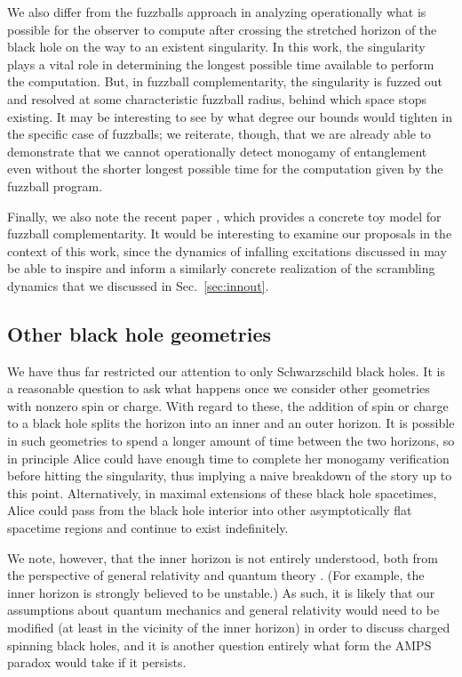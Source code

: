 \documentclass[a4paper,11pt]{article}
\theoremstyle{definition}
\newcommand{\Sec}[1]{Sec.~\ref{#1}}
\begin{document}
We also differ from the fuzzballs approach in analyzing operationally what is possible for the observer to compute after crossing the stretched horizon of the black hole on the way to an existent singularity.
In this work, the singularity plays a vital role in determining the longest possible time available to perform the computation.
But, in fuzzball complementarity, the singularity is fuzzed out and resolved at some characteristic fuzzball radius, behind which space stops existing. 
It may be interesting to see by what degree our bounds would tighten in the specific case of fuzzballs; we reiterate, though, that we are already able to demonstrate that we cannot operationally detect monogamy of entanglement even without the shorter longest possible time for the computation given by the fuzzball program.

Finally, we also note the recent paper \cite{Mathur:2015nra}, which provides a concrete toy model for fuzzball complementarity.
It would be interesting to examine our proposals in the context of this work, since the dynamics of infalling excitations discussed in \cite{Mathur:2015nra} may be able to inspire and inform a similarly concrete realization of the scrambling dynamics that we discussed in \Sec{sec:innout}.


\subsection{Other black hole geometries}

We have thus far restricted our attention to only Schwarzschild black holes. It is a reasonable question to ask what happens once we consider other geometries with nonzero spin or charge. With regard to these, the addition of spin or charge to a black hole splits the horizon into an inner and an outer horizon.
It is possible in such geometries to spend a longer amount of time between the two horizons, so in principle Alice could have enough time to complete her monogamy verification before hitting the singularity, thus implying a naive breakdown of the story up to this point.
Alternatively, in maximal extensions of these black hole spacetimes, Alice could pass from the black hole interior into other asymptotically flat spacetime regions and continue to exist indefinitely.

We note, however, that the inner horizon is not entirely understood, both from the perspective of general relativity and quantum theory \cite{Dotti:2010uc, Engelhardt:2015gla}.
(For example, the inner horizon is strongly believed to be unstable.)
As such, it is likely that our assumptions about quantum mechanics and general relativity would need to be modified (at least in the vicinity of the inner horizon) in order to discuss charged spinning black holes, and it is another question entirely what form the AMPS paradox would take if it persists.
\end{document}
